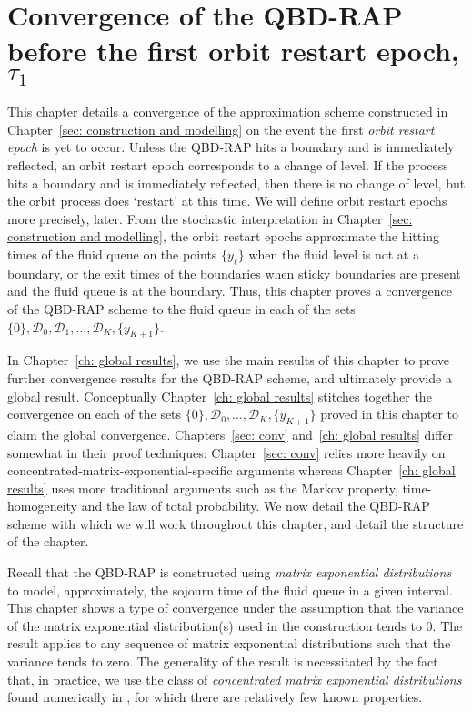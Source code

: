 \chapter{Convergence of the QBD-RAP before the first orbit restart epoch, \(\tau_1\)\label{sec: conv}}
This chapter details a convergence of the approximation scheme constructed in Chapter~\ref{sec: construction and modelling} on the event the first \emph{orbit restart epoch} is yet to occur. Unless the QBD-RAP hits a boundary and is immediately reflected, an orbit restart epoch corresponds to a change of level. If the process hits a boundary and is immediately reflected, then there is no change of level, but the orbit process does `restart' at this time. We will define orbit restart epochs more precisely, later. From the stochastic interpretation in Chapter~\ref{sec: construction and modelling}, the orbit restart epochs approximate the hitting times of the fluid queue on the points \(\{y_\ell\}\) when the fluid level is not at a boundary, or the exit times of the boundaries when sticky boundaries are present and the fluid queue is at the boundary. Thus, this chapter proves a convergence of the QBD-RAP scheme to the fluid queue in each of the sets \(\{0\}, \mathcal D_{0}, \mathcal D_1, \dots, \mathcal D_{K}, \{y_{K+1}\}\).

In Chapter~\ref{ch: global results}, we use the main results of this chapter to prove further convergence results for the QBD-RAP scheme, and ultimately provide a global result. Conceptually Chapter~\ref{ch: global results} stitches together the convergence on each of the sets \(\{0\}, \mathcal D_{0}, \dots, \mathcal D_{K}, \{y_{K+1}\}\) proved in this chapter to claim the global convergence. Chapters~\ref{sec: conv} and~\ref{ch: global results} differ somewhat in their proof techniques: Chapter~\ref{sec: conv} relies more heavily on concentrated-matrix-exponential-specific arguments whereas Chapter~\ref{ch: global results} uses more traditional arguments such as the Markov property, time-homogeneity and the law of total probability. We now detail the QBD-RAP scheme with which we will work throughout this chapter, and detail the structure of the chapter.

Recall that the QBD-RAP is constructed using \emph{matrix exponential distributions} to model, approximately, the sojourn time of the fluid queue in a given interval. This chapter shows a type of convergence under the assumption that the variance of the matrix exponential distribution(s) used in the construction tends to 0. The result applies to any sequence of matrix exponential distributions such that the variance tends to zero. The generality of the result is necessitated by the fact that, in practice, we use the class of \emph{concentrated matrix exponential distributions} found numerically in \citep{hht2020}, for which there are relatively few known properties.

